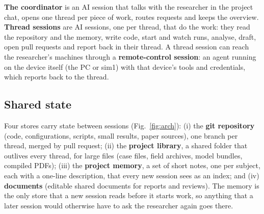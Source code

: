\documentclass[preprint,review,12pt]{elsarticle}
\begin{document}
\textbf{The coordinator} is an AI session that talks with the researcher in the project chat, opens one thread per
piece of work, routes requests and keeps the overview. \textbf{Thread sessions} are AI sessions, one per thread, that
do the work: they read the repository and the memory, write code, start and watch runs, analyse, draft, open pull
requests and report back in their thread. A thread session can reach the researcher's machines through a
\textbf{remote-control session}: an agent running on the device itself (the PC or sim1) with that device's tools and
credentials, which reports back to the thread.

\subsection{Shared state}
Four stores carry state between sessions (Fig.~\ref{fig:arch}):
(i) the \textbf{git repository} (code, configurations, scripts, small results, paper sources), one branch per thread,
merged by pull request;
(ii) the \textbf{project library}, a shared folder that outlives every thread, for large files (case files, field
archives, model bundles, compiled PDFs);
(iii) the \textbf{project memory}, a set of short notes, one per subject, each with a one-line description, that every
new session sees as an index; and
(iv) \textbf{documents} (editable shared documents for reports and reviews).
The memory is the only store that a new session reads before it starts work, so anything that a later session would
otherwise have to ask the researcher again goes there.
\end{document}
